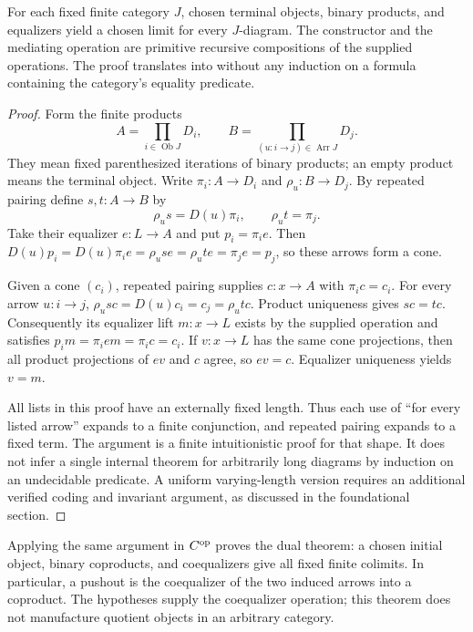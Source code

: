 \begin{theorem}\label{thm:finite-limits}
For each fixed finite category $J$, chosen terminal objects, binary products,
and equalizers yield a chosen limit for every $J$-diagram.  The constructor
and the mediating operation are primitive recursive compositions of the
supplied operations.  The proof translates into \ipra{} without any induction
on a formula containing the category's equality predicate.
\end{theorem}
\begin{proof}
Form the finite products
\[
 A=\prod_{i\in\operatorname{Ob}J}D_i,
 \qquad B=\prod_{(u:i\to j)\in\operatorname{Arr}J}D_j.
\]
They mean fixed parenthesized iterations of binary products; an empty product
means the terminal object.  Write $\pi_i:A\to D_i$ and
$\rho_u:B\to D_j$.  By repeated pairing define $s,t:A\to B$ by
\[
 \rho_u s=D(u)\pi_i,\qquad \rho_u t=\pi_j.
\]
Take their equalizer $e:L\to A$ and put $p_i=\pi_i e$.  Then
$D(u)p_i=D(u)\pi_i e=\rho_u se=\rho_u te=\pi_j e=p_j$, so these arrows
form a cone.

Given a cone $(c_i)$, repeated pairing supplies $c:x\to A$ with
$\pi_i c=c_i$.  For every arrow $u:i\to j$,
$\rho_u sc=D(u)c_i=c_j=\rho_u tc$.  Product uniqueness gives $sc=tc$.
Consequently its equalizer lift $m:x\to L$ exists by the supplied operation
and satisfies $p_i m=\pi_i em=\pi_i c=c_i$.  If $v:x\to L$ has the same
cone projections, then all product projections of $ev$ and $c$ agree, so
$ev=c$.  Equalizer uniqueness yields $v=m$.

All lists in this proof have an externally fixed length.  Thus each use of
``for every listed arrow'' expands to a finite conjunction, and repeated
pairing expands to a fixed term.  The argument is a finite intuitionistic
proof for that shape.  It does not infer a single internal theorem for
arbitrarily long diagrams by induction on an undecidable predicate.  A
uniform varying-length version requires an additional verified coding and
invariant argument, as discussed in the foundational section.
\end{proof}

Applying the same argument in $C^{\mathrm{op}}$ proves the dual theorem: a chosen
initial object, binary coproducts, and coequalizers give all fixed finite
colimits.  In particular, a pushout is the coequalizer of the two induced
arrows into a coproduct.  The hypotheses supply the coequalizer operation;
this theorem does not manufacture quotient objects in an arbitrary category.

